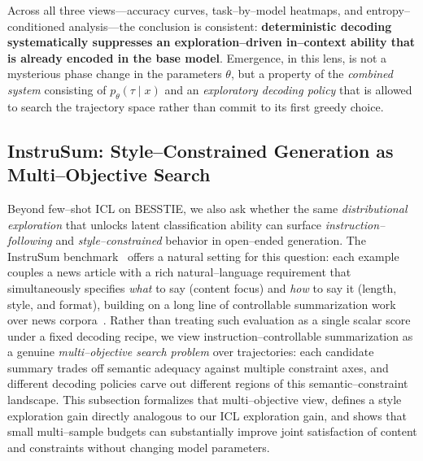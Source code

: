 Across all three views---accuracy curves, task--by--model heatmaps, and
entropy--conditioned analysis—the conclusion is consistent:
\textbf{deterministic decoding systematically suppresses an
exploration--driven in--context ability that is already encoded in the
base model}. Emergence, in this lens, is not a mysterious phase change
in the parameters $\theta$, but a property of the \emph{combined
system} consisting of $p_\theta(\tau\mid x)$ and an \emph{exploratory
decoding policy} that is allowed to search the trajectory space rather
than commit to its first greedy choice.








































\subsection{InstruSum: Style--Constrained Generation as Multi--Objective Search}
\label{subsec:instrusum-overview}

Beyond few--shot ICL on BESSTIE, we also ask whether the same
\emph{distributional exploration} that unlocks latent classification
ability can surface \emph{instruction--following} and
\emph{style--constrained} behavior in open--ended generation.  The
InstruSum benchmark~\citep{liu2024instrusum} offers a natural setting
for this question: each example couples a news article with a rich
natural--language requirement that simultaneously specifies \emph{what}
to say (content focus) and \emph{how} to say it (length, style, and
format), building on a long line of controllable summarization work over
news corpora~\citep{hermann2015teaching,nallapati2016abstractive,
fan2018controllable,he2020ctrlsum,chan2021constrained}.  Rather than
treating such evaluation as a single scalar score under a fixed decoding
recipe, we view instruction--controllable summarization as a genuine
\emph{multi--objective search problem} over trajectories: each candidate
summary trades off semantic adequacy against multiple constraint axes,
and different decoding policies carve out different regions of this
semantic--constraint landscape.  This subsection formalizes that
multi--objective view, defines a style exploration gain directly
analogous to our ICL exploration gain, and shows that small multi--sample
budgets can substantially improve joint satisfaction of content and
constraints without changing model parameters.


